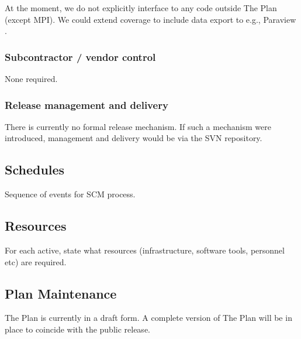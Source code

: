 At the moment, we do not explicitly interface to any code outside The
Plan (except MPI). We could extend coverage to include data export
to e.g., Paraview \cite{paraview}.

\subsubsection{Subcontractor / vendor control}

None required.

\subsubsection{Release management and delivery}

There is currently no formal release mechanism. If such a mechanism were
introduced, management and  delivery would be via the SVN repository.

\subsection{Schedules}

Sequence of events for SCM process.

\subsection{Resources}

For each active, state what resources (infrastructure, software tools,
personnel etc) are required.


\subsection{Plan Maintenance}

The Plan is currently in a draft form. A complete version of The Plan
will be in place to coincide with the public release.

